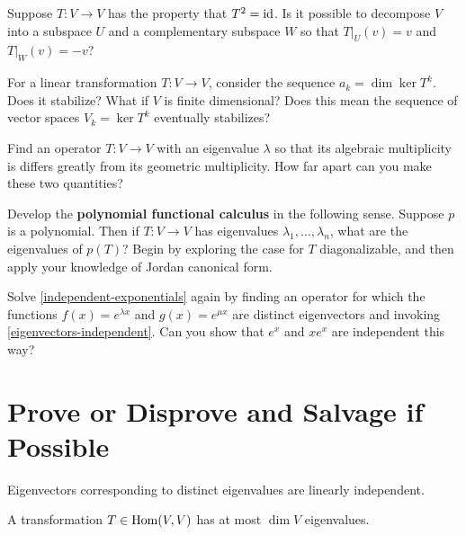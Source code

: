 \documentclass{homework}
\begin{document}
\begin{problem}
  Suppose $T : V \to V$ has the property that $T^2 = \operatorname{id}$.  Is it possible to decompose
  $V$ into a subspace $U$ and a complementary subspace $W$ so that
  $T |_U(v) = v$ and $T |_W(v) = -v$?
\end{problem}

\begin{problem}
  For a linear transformation $T : V \to V$, consider the sequence
  $a_k = \dim \ker T^k$.  Does it stabilize?  What if $V$ is finite
  dimensional?  Does this mean the sequence of vector
  spaces $V_k = \ker T^k$ eventually stabilizes?
\end{problem}

\begin{problem}
  Find an operator $T : V \to V$ with an eigenvalue $\lambda$ so that
  its algebraic multiplicity is differs greatly from its geometric
  multiplicity.  How far apart can you make these two quantities?
\end{problem}

\begin{problem}\label{polynomial-functional-calculus}Develop the \textbf{polynomial functional calculus} in the following sense.  Suppose $p$ is a polynomial.  Then if $T : V \to V$ has eigenvalues $\lambda_1, \ldots, \lambda_n$, what are the eigenvalues of $p(T)$?  Begin by exploring the case for $T$ diagonalizable, and then apply your knowledge of Jordan canonical form.
\end{problem}

\begin{problem}
  Solve \ref{independent-exponentials} again by finding an operator for which the functions $f(x) = e^{\lambda x}$ and $g(x) = e^{\mu x}$ are distinct eigenvectors and invoking \ref{eigenvectors-independent}.  Can you show that $e^x$ and $xe^x$ are independent this way?
\end{problem}

\section{Prove or Disprove and Salvage if Possible}

\begin{problem}\label{eigenvectors-independent}
  Eigenvectors corresponding to distinct eigenvalues are linearly independent.
\end{problem}

\begin{problem}
  A transformation $T \in \operatorname{Hom}(V,V)$ has at most $\dim V$ eigenvalues.
\end{problem}
\end{document}
